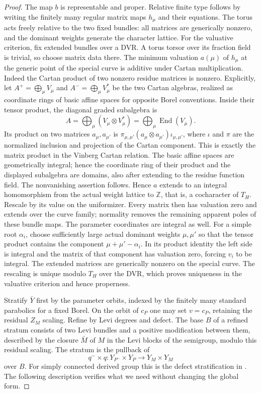 \documentclass[11pt]{article}
\numberwithin{equation}{section}
\theoremstyle{definition}
\theoremstyle{remark}
\begin{document}
\begin{proof}
The map $b$ is representable and proper.  Relative finite type follows by
writing the finitely many regular matrix maps $h_\mu$ and their equations.
The torus acts freely relative to the two fixed bundles: all matrices are
generically nonzero, and the dominant weights generate the character
lattice.  For the valuative criterion, fix extended bundles over a DVR.
A torus torsor over its fraction field is trivial, so choose matrix data
there.  The minimum valuation $a(\mu)$ of $h_\mu$ at the generic point of
the special curve is additive under Cartan multiplication.  Indeed the
Cartan product of two nonzero residue matrices is nonzero.  Explicitly,
let $A^+=\bigoplus_\mu V_\mu$ and
$A^-=\bigoplus_\mu V_\mu^*$ be the two Cartan algebras, realized as
coordinate rings of basic affine spaces for opposite Borel conventions.
Inside their tensor product, the diagonal graded subalgebra is
\[
 A=\bigoplus_\mu(V_\mu\otimes V_\mu^*)
   =\bigoplus_\mu\operatorname{End}(V_\mu).
\]
Its product on two matrices $a_\mu,a_{\mu'}$ is
$\pi_{\mu,\mu'}(a_\mu\otimes a_{\mu'})\iota_{\mu,\mu'}$, where
$\iota$ and $\pi$ are the normalized inclusion and projection of the
Cartan component.  This is exactly the matrix product in the Vinberg
Cartan relation.  The basic affine spaces are geometrically integral;
hence the coordinate ring of their product and the displayed subalgebra
are domains, also after
extending to the residue function field.  The nonvanishing assertion
follows.  Hence $a$ extends to
an integral homomorphism from the actual weight lattice to $\mathbb Z$,
that is, a cocharacter of $T_H$.  Rescale by its value on the uniformizer.
Every matrix then has valuation zero and extends over the curve family;
normality removes the remaining apparent poles of these bundle maps.
The parameter coordinates are integral as well.  For a simple root
$\alpha_i$, choose sufficiently large actual dominant weights $\mu,\mu'$
so that the tensor product contains the component
$\mu+\mu'-\alpha_i$.  In its product identity the left side is integral
and the matrix of that component has valuation zero, forcing $v_i$ to be
integral.  The extended matrices are generically nonzero on the special
curve.  The rescaling is unique modulo $T_H$ over the DVR, which proves
uniqueness in the valuative criterion and hence properness.

Stratify $\bar Y$ first by the parameter orbits, indexed by the finitely
many standard parabolics for a fixed Borel.
On the orbit of $c_P$ one may set $v=c_P$, retaining the residual $Z_M$
scaling.  Refine by Levi degrees and defect.  The base $B$ of a refined
stratum consists of two Levi bundles and a positive modification between
them, described by the closure $\bar M$ of $M$ in the Levi blocks of the
semigroup, modulo this residual scaling.  The stratum is the pullback of
\begin{equation}\label{eq:M5}
 q^-\times q:Y_{P^-}\times Y_P\longrightarrow Y_M\times Y_M
\end{equation}
over $B$.  For simply connected derived group this is the defect
stratification in \cite[Proposition~3.2.2]{SchiederVinberg}.  The following
description verifies what we need without changing the global form.


\end{proof}
\end{document}
